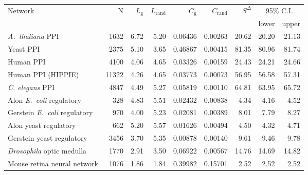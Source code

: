 \begin{tabular}{lrrrrrrrr}
\hline
Network & N  & $L_{\mathrm{g}}$ & $L_{\mathrm{rand}}$ & $C_{\mathrm{g}}$ & $C_{\mathrm{rand}}$ &  $S^{\Delta}$ & \multicolumn{2}{c}{95\% C.I.}\\
        &    &                   &                      &                   &                      &             &  lower   & upper \\
\hline
\textit{A.~thaliana} PPI & 1632 & 6.72 & 5.20 & 0.06436 & 0.00263 & 20.62 & 20.20 & 21.13\\
Yeast PPI & 2375 & 5.10 & 3.65 & 0.46867 & 0.00415 & 81.35 & 80.96 & 81.74\\
Human PPI & 4100 & 4.06 & 4.65 & 0.03326 & 0.00159 & 24.43 & 24.21 & 24.66\\
Human PPI (HIPPIE) & 11322 & 4.26 & 4.65 & 0.03773 & 0.00073 & 56.95 & 56.58 & 57.31\\
\textit{C. elegans} PPI & 4847 & 4.49 & 5.27 & 0.05819 & 0.00110 & 64.81 & 63.95 & 65.72\\
Alon \textit{E.~coli} regulatory & 328 & 4.83 & 5.51 & 0.02432 & 0.00838 & 4.34 & 4.16 & 4.52\\
Gerstein \textit{E.~coli} regulatory & 970 & 4.00 & 5.23 & 0.02081 & 0.00389 & 8.01 & 7.79 & 8.27\\
Alon yeast regulatory & 662 & 5.20 & 5.57 & 0.01626 & 0.00494 & 4.50 & 4.32 & 4.71\\
Gerstein yeast regulatory & 3456 & 3.70 & 5.35 & 0.00878 & 0.00140 & 9.61 & 9.46 & 9.78\\
\textit{Drosophila} optic medulla & 1770 & 2.91 & 3.50 & 0.06922 & 0.00567 & 14.76 & 14.69 & 14.82\\
Mouse retina neural network & 1076 & 1.86 & 1.84 & 0.39982 & 0.15701 & 2.52 & 2.52 & 2.52\\
\hline
\end{tabular}
